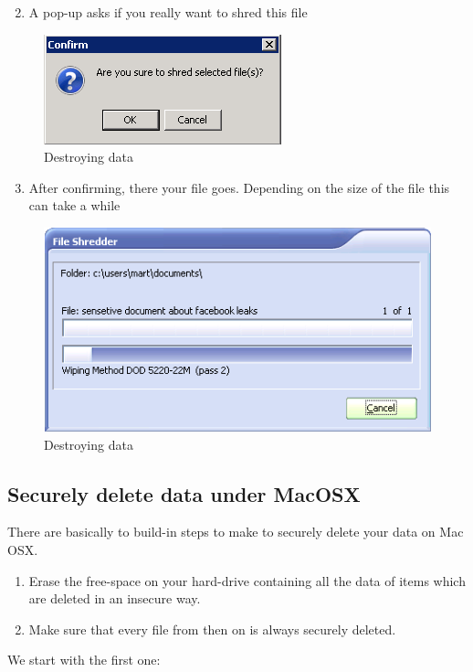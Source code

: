 \begin{enumerate}[1.]
\setcounter{enumi}{1}
\item
  A pop-up asks if you really want to shred this file
\end{enumerate}
\begin{figure}[htbp]
\centering
\includegraphics{destroy_data_002.png}
\caption{Destroying data}
\end{figure}

\begin{enumerate}[1.]
\setcounter{enumi}{2}
\item
  After confirming, there your file goes. Depending on the size of the
  file this can take a while
\end{enumerate}
\begin{figure}[htbp]
\centering
\includegraphics{destroy_data_003.png}
\caption{Destroying data}
\end{figure}

\subsection{Securely delete data under MacOSX}

There are basically to build-in steps to make to securely delete your
data on Mac OSX.

\begin{enumerate}[1.]
\item
  Erase the free-space on your hard-drive containing all the data of
  items which are deleted in an insecure way.
\item
  Make sure that every file from then on is always securely deleted.
\end{enumerate}
We start with the first one:

